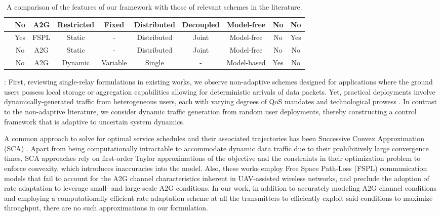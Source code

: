 \documentclass[12pt, draftcls, onecolumn]{IEEEtran}
\theoremstyle{plain}
\theoremstyle{definition}
\theoremstyle{remark}
\begin{document}
\begin{table}
\begin{center}
\begin{tabular}{|*{10}{c|}}
    \hline
    \cite{RLSenseSend} & No & A2G & Restricted & Fixed & Distributed & Decoupled & Model-free & No & No\\
    \hline
    \cite{DQNPositioning} & Yes & FSPL & Static & - & Distributed & Joint & Model-free & No & Yes\\
    \hline
    \cite{MLDeployment} & No & A2G & Static & - & Distributed & Joint & Model-free & No & No\\
    \hline
    \cite{Rician} & No & A2G & Dynamic & Variable & Single & - & Model-based & Yes & No\\
    \hline
    \end{tabular}
    \caption{A comparison of the features of our framework with those of relevant schemes in the literature.}\label{T1}
\end{center}
\vspace{-4mm}
\end{table}

: First, reviewing single-relay formulations in existing works, we observe non-adaptive schemes \cite{SCA, PAoI, MEC-CVX, LoSMap, Rician} designed for applications where the ground users possess local storage or aggregation capabilities allowing for deterministic arrivals of data packets. Yet, practical deployments involve dynamically-generated traffic from heterogeneous users, each with varying degrees of QoS mandates and technological prowess \cite{UAVSurvey, UAVTutorial}. In contrast to the non-adaptive literature, we consider dynamic traffic generation from random user deployments, thereby constructing a control framework that is adaptive to uncertain system dynamics.

A common approach to solve for optimal service schedules and their associated trajectories has been Successive Convex Approximation (SCA) \cite{SCA, PAoI, MEC-CVX, Rician}. Apart from being computationally intractable to accommodate dynamic data traffic due to their prohibitively large convergence times, SCA approaches rely on first-order Taylor approximations of the objective and the constraints in their optimization problem to enforce convexity, which introduces inaccuracies into the model. Also, these works employ Free Space Path-Loss (FSPL) communication models that fail to account for the A2G channel characteristics inherent in UAV-assisted wireless networks, and preclude the adoption of rate adaptation to leverage small- and large-scale A2G conditions. In our work, in addition to accurately modeling A2G channel conditions and employing a computationally efficient rate adaptation scheme at all the transmitters to efficiently exploit said conditions to maximize throughput, there are no such approximations in our formulation.
\end{document}
